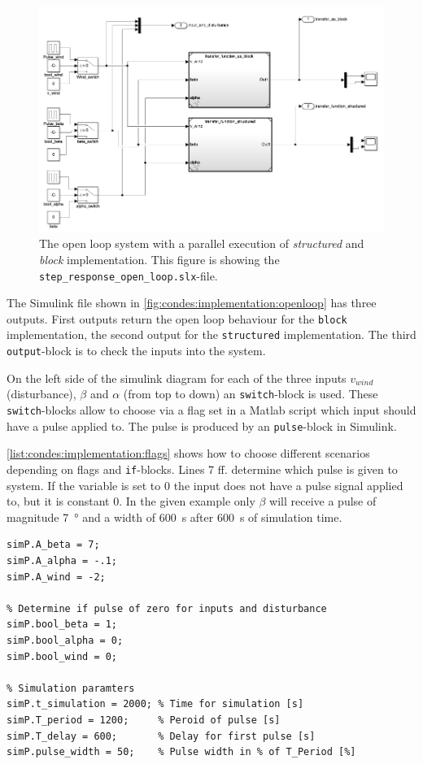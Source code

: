 \begin{figure}[H]
    \center
    \includegraphics[width=1\textwidth,scale=1,trim=0 0 0 0,clip]{fig/Simulink/simulink_open_loop.png}
    \caption{The open loop system with a parallel execution of \textit{structured} and \textit{block} implementation. This figure is showing the \texttt{step\_response\_open\_loop.slx}-file.}
    \label{fig:condes:implementation:openloop}
\end{figure}

The Simulink file shown in \autoref{fig:condes:implementation:openloop} has three outputs.
First outputs return the open loop behaviour for the \texttt{block} implementation, the second output for the \texttt{structured} implementation. 
The third \texttt{output}-block is to check the inputs into the system.

On the left side of the simulink diagram for each of the three inputs $v_{wind}$ (disturbance), $\beta$ and $\alpha$ (from top to down) an \texttt{switch}-block is used.
These \texttt{switch}-blocks allow to choose via a flag set in a Matlab script which input should have a pulse applied to.
The pulse is produced by an \texttt{pulse}-block in Simulink.

\autoref{list:condes:implementation:flags} shows how to choose different scenarios depending on flags and \texttt{if}-blocks.
Lines 7 ff. determine which pulse is given to system.
If the variable is set to $0$ the input does not have a pulse signal applied to, but it is constant $0$.
In the given example only $\beta$ will receive a pulse of magnitude \SI{7}{\degree} and a width of \SI{600}{\second} after \SI{600}{\second} of simulation time.

\begin{lstlisting}[style=Matlab-editor,caption={Setting flags for different combination of input pulses.},captionpos=b,label={list:condes:implementation:flags}]
% Setting amplitudes for pulse
simP.A_beta = 7;
simP.A_alpha = -.1;
simP.A_wind = -2;

% Determine if pulse of zero for inputs and disturbance
simP.bool_beta = 1;
simP.bool_alpha = 0;
simP.bool_wind = 0;

% Simulation paramters
simP.t_simulation = 2000; % Time for simulation [s]
simP.T_period = 1200;     % Peroid of pulse [s]
simP.T_delay = 600;       % Delay for first pulse [s]
simP.pulse_width = 50;    % Pulse width in % of T_Period [%]
\end{lstlisting}



